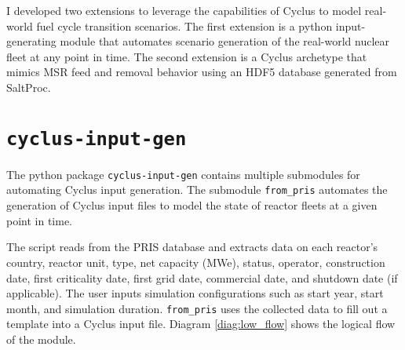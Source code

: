 I developed two extensions to leverage 
the capabilities of Cyclus to model
real-world fuel cycle transition scenarios.
The first extension is a python input-generating module
that automates scenario generation of the real-world 
nuclear fleet at any point in time. The second extension
is a Cyclus archetype that mimics \gls{MSR} feed and removal
behavior using an HDF5 database generated from SaltProc.

\section{\texttt{cyclus-input-gen}}
\label{sec:writeinput}
The python package \texttt{cyclus-input-gen} contains
multiple submodules for automating Cyclus input generation.
The submodule \texttt{from\_pris} automates the generation of Cyclus input files
to model the state of reactor fleets at a given
point in time.

The script reads from the \gls{PRIS} database \cite{iaea_nuclear_2018}
and extracts data on each reactor's country, reactor unit,
type, net capacity (MWe), status, operator, construction date,
first criticality date, first grid date, commercial date,
and shutdown date (if applicable). The user inputs simulation
configurations such as start year, start month, and
simulation duration. \texttt{from\_pris} uses the collected data to
fill out a template into a Cyclus input file. 
Diagram \ref{diag:low_flow} shows the logical flow of the module.



